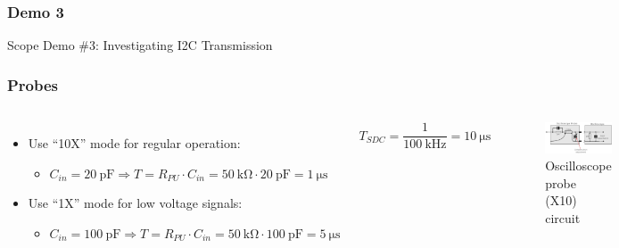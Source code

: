 \begin{frame}[standout]
  \frametitle{Demo 3}
  Scope Demo \#3: Investigating I2C Transmission
\end{frame}

\begin{frame}
  \frametitle{Probes}
  \begin{columns}
      \begin{itemize}
        \item Use ``10X'' mode for regular operation:
          \begin{itemize}
            \item $ C_{in} = \SI{20}{\pF} \Rightarrow T = R_{PU} \cdot C_{in} = \SI{50}{\kohm} \cdot \SI{20}{\pF} = \SI{1}{\us} $
          \end{itemize}
        \item Use ``1X'' mode for low voltage signals:
          \begin{itemize}
            \item $ C_{in} = \SI{100}{\pF} \Rightarrow T = R_{PU} \cdot C_{in} = \SI{50}{\kohm} \cdot \SI{100}{\pF} = \SI{5}{\us} $
          \end{itemize}
      \end{itemize}
  \vspace*{5mm}
  \[ T_{SDC} = \frac{1}{\SI{100}{\kHz}} = \SI{10}{\us} \]
      \begin{figure}
        \centering
          \hspace*{-5mm}\includegraphics[scale=0.27]{images/scope-probe-x10-circuit.pdf}\hspace*{-4mm}
        \caption{Oscilloscope probe (X10) circuit}
      \end{figure}
  \end{columns}
\end{frame}

